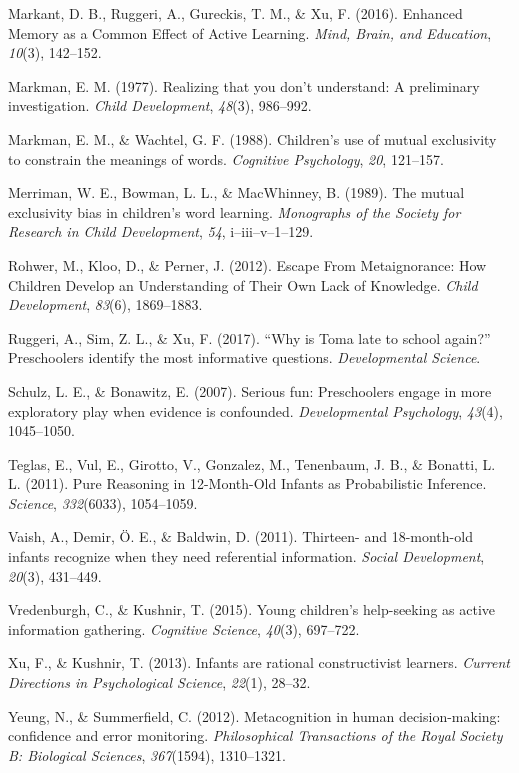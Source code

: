 \documentclass[english,man]{apa6}
\theoremstyle{definition}
\theoremstyle{definition}
\theoremstyle{definition}
\theoremstyle{remark}
\begin{document}
\hypertarget{ref-Markant2016}{}
Markant, D. B., Ruggeri, A., Gureckis, T. M., \& Xu, F. (2016). Enhanced
Memory as a Common Effect of Active Learning. \emph{Mind, Brain, and
Education}, \emph{10}(3), 142--152.

\hypertarget{ref-Markman1977}{}
Markman, E. M. (1977). Realizing that you don't understand: A
preliminary investigation. \emph{Child Development}, \emph{48}(3),
986--992.

\hypertarget{ref-Markman1988}{}
Markman, E. M., \& Wachtel, G. F. (1988). Children's use of mutual
exclusivity to constrain the meanings of words. \emph{Cognitive
Psychology}, \emph{20}, 121--157.

\hypertarget{ref-Merriman1989}{}
Merriman, W. E., Bowman, L. L., \& MacWhinney, B. (1989). The mutual
exclusivity bias in children's word learning. \emph{Monographs of the
Society for Research in Child Development}, \emph{54},
i--iii--v--1--129.

\hypertarget{ref-Rohwer2012}{}
Rohwer, M., Kloo, D., \& Perner, J. (2012). Escape From Metaignorance:
How Children Develop an Understanding of Their Own Lack of Knowledge.
\emph{Child Development}, \emph{83}(6), 1869--1883.

\hypertarget{ref-Ruggeri2017}{}
Ruggeri, A., Sim, Z. L., \& Xu, F. (2017). ``Why is Toma late to school
again?'' Preschoolers identify the most informative questions.
\emph{Developmental Science}.

\hypertarget{ref-Schulz2007}{}
Schulz, L. E., \& Bonawitz, E. (2007). Serious fun: Preschoolers engage
in more exploratory play when evidence is confounded.
\emph{Developmental Psychology}, \emph{43}(4), 1045--1050.

\hypertarget{ref-Teglas2011}{}
Teglas, E., Vul, E., Girotto, V., Gonzalez, M., Tenenbaum, J. B., \&
Bonatti, L. L. (2011). Pure Reasoning in 12-Month-Old Infants as
Probabilistic Inference. \emph{Science}, \emph{332}(6033), 1054--1059.

\hypertarget{ref-Vaish2011}{}
Vaish, A., Demir, Ö. E., \& Baldwin, D. (2011). Thirteen- and
18-month-old infants recognize when they need referential information.
\emph{Social Development}, \emph{20}(3), 431--449.

\hypertarget{ref-Vredenburgh2015}{}
Vredenburgh, C., \& Kushnir, T. (2015). Young children's help-seeking as
active information gathering. \emph{Cognitive Science}, \emph{40}(3),
697--722.

\hypertarget{ref-Xu2013}{}
Xu, F., \& Kushnir, T. (2013). Infants are rational constructivist
learners. \emph{Current Directions in Psychological Science},
\emph{22}(1), 28--32.

\hypertarget{ref-Yeung2012}{}
Yeung, N., \& Summerfield, C. (2012). Metacognition in human
decision-making: confidence and error monitoring. \emph{Philosophical
Transactions of the Royal Society B: Biological Sciences},
\emph{367}(1594), 1310--1321.
\end{document}
